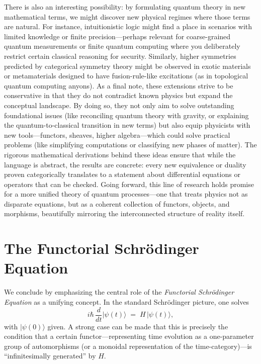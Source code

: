 \documentclass[12pt]{article}
\begin{document}
There is also an interesting possibility: by formulating quantum theory in new mathematical terms, we might discover new physical regimes where those terms are natural. For instance, intuitionistic logic might find a place in scenarios with limited knowledge or finite precision---perhaps relevant for coarse-grained quantum measurements or finite quantum computing where you deliberately restrict certain classical reasoning for security. Similarly, higher symmetries predicted by categorical symmetry theory might be observed in exotic materials or metamaterials designed to have fusion-rule-like excitations (as in topological quantum computing anyons). As a final note, these extensions strive to be conservative in that they do not contradict known physics but expand the conceptual landscape. By doing so, they not only aim to solve outstanding foundational issues (like reconciling quantum theory with gravity, or explaining the quantum-to-classical transition in new terms) but also equip physicists with new tools---functors, sheaves, higher algebra---which could solve practical problems (like simplifying computations or classifying new phases of matter). The rigorous mathematical derivations behind these ideas ensure that while the language is abstract, the results are concrete: every new equivalence or duality proven categorically translates to a statement about differential equations or operators that can be checked. Going forward, this line of research holds promise for a more unified theory of quantum processes---one that treats physics not as disparate equations, but as a coherent collection of functors, objects, and morphisms, beautifully mirroring the interconnected structure of reality itself.


\section{The Functorial Schrödinger Equation}

We conclude by emphasizing the central role of the \emph{Functorial Schrödinger Equation} as a unifying concept.  In the standard Schrödinger picture, one solves
\[
   i\hbar\, \frac{d}{dt} \lvert \psi(t)\rangle \;=\; H\,\lvert \psi(t)\rangle,
\]
with $\lvert \psi(0)\rangle$ given.  A strong case can be made that this is precisely the condition that a certain functor---representing time evolution as a one-parameter group of automorphisms (or a monoidal representation of the time-category)---is ``infinitesimally generated'' by $H$.  
\end{document}
